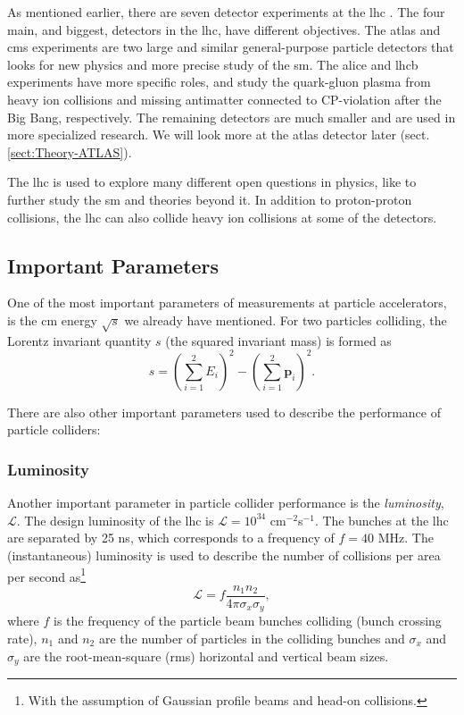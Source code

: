 \documentclass[a4paper, american, 12pt]{report}
\begin{document}
	As mentioned earlier, there are seven detector experiments at the \acrshort{lhc} \cite{DetectorsatCERN}. The four main, and biggest, detectors in the \acrshort{lhc}, have different objectives. The \acrshort{atlas} and \acrshort{cms} experiments are two large and similar general-purpose particle detectors that looks for new physics and more precise study of the \acrshort{sm}. The \acrshort{alice} and \acrshort{lhcb} experiments have more specific roles, and study the quark-gluon plasma from heavy ion collisions and missing antimatter connected to CP-violation after the Big Bang, respectively. The remaining detectors are much smaller and are used in more specialized research. We will look more at the \acrshort{atlas} detector later (sect.\ref{sect:Theory-ATLAS}).
	
	The \acrshort{lhc} is used to explore many different open questions in physics, like to further study the \acrshort{sm} and theories beyond it. In addition to proton-proton collisions, the \acrshort{lhc} can also collide heavy ion collisions at some of the detectors. 	
	
	
	\subsection{Important Parameters}
	\label{subsect:Theory-Important_params}
	One of the most important parameters of measurements at particle accelerators, is the \acrshort{cm} energy $\sqrt{s}$ we already have mentioned. For two particles colliding, the Lorentz invariant quantity $s$ (the squared invariant mass) is formed as
	\begin{equation}
	\label{eq:s_accelerators}
		s=\left(\sum_{i=1}^2E_i\right)^2-\left(\sum_{i=1}^2\textbf{p}_i\right)^2.
	\end{equation}
	
	There are also other important parameters used to describe the performance of particle colliders:
	
	
	\subsubsection{Luminosity}
	\label{subsubsect:Theory-Luminosity}
	Another important parameter in particle collider performance is the \textit{luminosity}, $\mathcal{L}$. The design luminosity of the \acrshort{lhc} is $\mathcal{L}=10^{34}$ cm$^{-2}$s$^{-1}$. The bunches at the \acrshort{lhc} are separated by 25 ns, which corresponds to a frequency of $f=40$ MHz. The (instantaneous) luminosity is used to describe the number of collisions per area per second as\footnote{With the assumption of Gaussian profile beams and head-on collisions.}
	\begin{equation}
	\label{eq:Luminosity}
		\mathcal{L}=f\frac{n_1n_2}{4\pi \sigma_x \sigma_y},
	\end{equation}
	where $f$ is the frequency of the particle beam bunches colliding (bunch crossing rate), $n_1$ and $n_2$ are the number of particles in the colliding bunches and $\sigma_x$ and $\sigma_y$ are the root-mean-square (rms) horizontal and vertical beam sizes.
	
\end{document}
